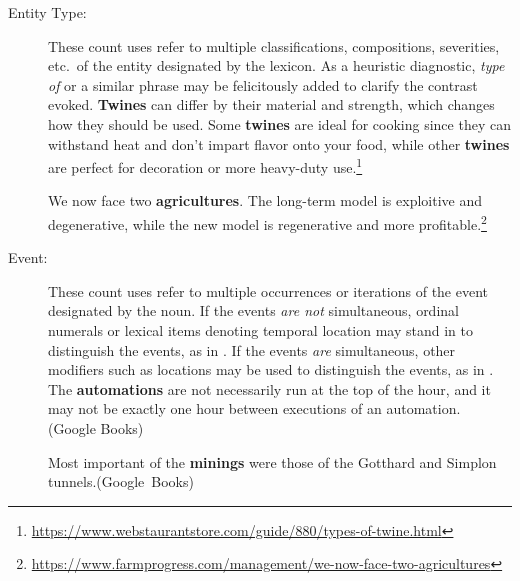 \documentclass[output=paper]{langscibook}
\begin{document}
\begin{description}\sloppy
\item[Entity Type:] These count uses refer to multiple classifications, compositions, severities, etc.\ of the entity designated by the lexicon. As a heuristic diagnostic, \emph{type of} or a similar phrase may be felicitously added to clarify the contrast evoked.
\eanoraggedright \label{gri-ric:ex:twines}
\textbf{Twines} can differ by their material and strength, which changes how they should be used. Some \textbf{twines} are ideal for cooking since they can withstand heat and don’t impart flavor onto your food, while other \textbf{twines} are perfect for decoration or more heavy-duty use.\footnote{\url{https://www.webstaurantstore.com/guide/880/types-of-twine.html}} \z

\eanoraggedright \label{gri-ric:ex:agricultures} We now face two \textbf{agricultures}. The long-term model is exploitive and degenerative, while the new model is regenerative and more profitable.\footnote{\url{https://www.farmprogress.com/management/we-now-face-two-agricultures}} \z



\item[Event:] These count uses refer to multiple occurrences or iterations of the event designated by the noun. If the events \textit{are not} simultaneous, ordinal numerals or lexical items denoting temporal location may stand in to distinguish the events, as in  . %
If the events \textit{are} simultaneous, other modifiers such as locations may be used to distinguish the events, as in .
\eanoraggedright \label{gri-ric:ex:automations}
The \textbf{automations} are not necessarily run at the top of the hour, and it may not be exactly one hour between executions of an automation.\\\null\hfill (Google Books) 
\z 

\eanoraggedright \label{gri-ric:ex:minings}
Most important of the \textbf{minings} were those of the Gotthard and Simplon tunnels.\hbox{}\hfill\hbox{(Google Books)}
\z



\end{description}
\end{document}
